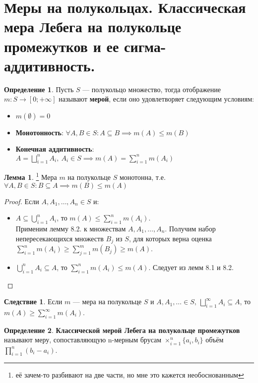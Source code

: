 \documentclass[11pt,a4paper]{report}
\theoremstyle{definition}
\theoremstyle{definition}
\newtheorem{lemma}{Лемма}[section]
\newtheorem{corollary}{Следствие}[section]
\theoremstyle{definition}
\newtheorem{definition}{Определение}[section]
\begin{document}
	\section{Меры на полукольцах. Классическая мера Лебега на полукольце промежутков и ее сигма-аддитивность.}
	\begin{definition}
	Пусть $ S $ — полукольцо множество, тогда отображение $ m: S \to [0; +\infty]$ называют \textbf{мерой}, если оно удовлетворяет следующим условиям:
	\begin{itemize}
		\item $ m(\emptyset) = 0 $
		\item \textbf{Монотонность}: $ \forall A, B \in S: A \subseteq B \implies m(A) \le m(B) $
		\item \textbf{Конечная аддитивность}: $ A = \bigsqcup\limits_{i=1}^{n} A_{i},\ A_{i} \in S \implies m(A) = \sum\limits_{i=1}^{n} m(A_{i}) $
	\end{itemize}
	\end{definition}
	\begin{lemma}\footnote{её зачем-то разбивают на две части, но мне это кажется необоснованным}
		Мера $ m $ на полукольце $ S $ монотонна, т.е. $ \forall A, B \in S: B \subseteq A \implies m(B) \le m(A) $
	\end{lemma}
	\begin{proof}
		Если $ A, A_{1}, \dots, A_{n} \in S $ и:
		\begin{itemize}
			\item $ A \subseteq \bigcup_{i=1}^{n}{A_{i}} $, то $ m(A) \le \sum_{i=1}^{n}{m(A_{i})} $.\\ 
			Применим лемму 8.2. к множествам $ A, A_{1}, \dots, A_{n} $. Получим набор непересекающихся множеств $ B_{j} $ из $ S $, для которых верна оценка $ \sum_{i=1}^{n}{m(A_{i})} \ge \sum_{j=1}^{m}{m(B_{j})}  \ge m(A) $.
			\item $ \bigcup_{i=1}^{n}{A_{i}} \subseteq A $, то $ \sum_{i=1}^{n}{m(A_{i})} \le m(A) $. Следует из лемм 8.1 и 8.2.
		\end{itemize}
	\end{proof}
	\begin{corollary}
		Если $ m $ — мера на полукольце $ S $ и $ A, A_{1}, \ldots \in S,\ \bigsqcup_{i=1}^{\infty}{A_{i}} \subseteq A $, то $ m(A) \ge \sum_{i=1}^{\infty}{m(A_{i})} $. 
	\end{corollary}
	\begin{definition}
		\textbf{Классической мерой Лебега на полукольце промежутков} называют меру, сопоставляющую n-мерным брусам $ \times_{i=1}^{n} \{a_{i}, b_{i}\} $ объём $ \prod_{i=1}^{n}{(b_{i} - a_{i})} $.
	\end{definition}
\end{document}

